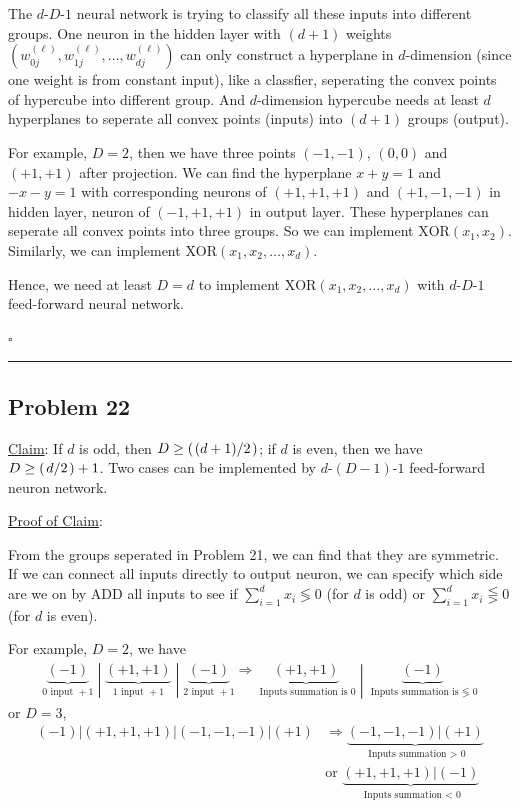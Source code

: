 \documentclass[12pt]{article}
\newcommand*{\QEDB}{\hfill\ensuremath{\square}}
\newcommand{\ParTh}[1]{\left(#1\right)}
\newcommand{\Divide}[2]{\left.#1\middle/#2\right.}
\newcommand{\horrule}[1]{\rule{\linewidth}{#1}}
\begin{document}
The $d\text{-}D\text{-}1$ neural network is trying to classify all these inputs into different groups. One neuron in the hidden layer with $\ParTh{d+1}$ weights $\ParTh{w^{\ParTh{\ell}}_{0j},w^{\ParTh{\ell}}_{1j},\ldots,w^{\ParTh{\ell}}_{dj}}$ can only construct a hyperplane in $d$-dimension (since one weight is from constant input), like a classfier, seperating the convex points of hypercube into different group. And $d$-dimension hypercube needs at least $d$ hyperplanes to seperate all convex points (inputs) into $\ParTh{d+1}$ groups (output).

For example, $D=2$, then we have three points $\ParTh{-1,-1}$, $\ParTh{0,0}$ and $\ParTh{+1,+1}$ after projection. We can find the hyperplane $x+y=1$ and $-x-y=1$ with corresponding neurons of $\ParTh{+1,+1,+1}$ and $\ParTh{+1,-1,-1}$ in hidden layer, neuron of $\ParTh{-1,+1,+1}$ in output layer. These hyperplanes can seperate all convex points into three groups. So we can implement $\text{XOR}\ParTh{x_1,x_2}$. Similarly, we can implement $\text{XOR}\ParTh{x_1,x_2,\ldots,x_d}$.

Hence, we need at least $D=d$ to implement $\text{XOR}\ParTh{x_1,x_2,\ldots,x_d}$ with $d\text{-}D\text{-}1$ feed-forward neural network.

\QEDB

\horrule{0.5pt}

\subsection*{Problem 22}

\underline{Claim}: If $d$ is odd, then $D\geq \ParTh{\Divide{\ParTh{d+1}}{2}}$; if $d$ is even, then we have $D\geq \ParTh{\Divide{d}{2}}+1$. Two cases can be implemented by $d\text{-}\ParTh{D-1}\text{-}1$ feed-forward neuron network.

\underline{Proof of Claim}:

From the groups seperated in Problem 21, we can find that they are symmetric. If we can connect all inputs directly to output neuron, we can specify which side are we on by $\text{ADD}$ all inputs to see if $\sum_{i=1}^{d}x_i\lessgtr0$ (for $d$ is odd) or $\sum_{i=1}^{d}x_i\lesseqgtr0$ (for $d$ is even).

For example, $D=2$, we have
\begin{align}
\left.\underbrace{\ParTh{-1}}_{0\text{ input } +1}\middle|\underbrace{\ParTh{+1,+1}}_{1\text{ input } +1}\middle|\underbrace{\ParTh{-1}}_{2\text{ input } +1}\right.\Rightarrow\left.\underbrace{\ParTh{+1,+1}}_{\text{ Inputs summation is }0}\middle|\underbrace{\ParTh{-1}}_{\text{ Inputs summation is }\lessgtr\text{ 0}}\right.
\end{align}
or $D=3$,
\begin{align}
\left.{\ParTh{-1}}\Big\vert{\ParTh{+1,+1,+1}}\Big\vert{\ParTh{-1,-1,-1}}\Big\vert{\ParTh{+1}}\right.&\Rightarrow\underbrace{\left.{\ParTh{-1,-1,-1}}\Big\vert{\ParTh{+1}}\right.}_{\text{ Inputs summation }>\text{ 0}}\\
\nonumber
&\text{or }\underbrace{\left.{\ParTh{+1,+1,+1}}\Big\vert{\ParTh{-1}}\right.}_{\text{ Inputs summation }<\text{ 0}}
\end{align}
\end{document}
